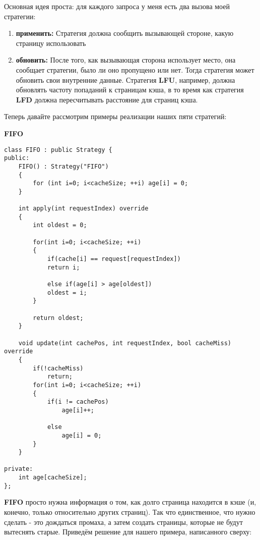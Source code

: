 Основная идея проста: для каждого запроса у меня есть два вызова моей стратегии:
\begin{enumerate}
    \item \textbf{применить:} Стратегия должна сообщить вызывающей стороне, какую страницу использовать
    \item \textbf{обновить:} После того, как вызывающая сторона использует место, она сообщает стратегии, было ли оно пропущено или нет. Тогда стратегия может обновить свои внутренние данные. Стратегия \textbf{LFU}, например, должна обновлять частоту попаданий к страницам кэша, в то время как стратегия \textbf{LFD} должна пересчитывать расстояние для страниц кэша.
\end{enumerate}

\vspace{\baselineskip}

Теперь давайте рассмотрим примеры реализации наших пяти стратегий:

\vspace{\baselineskip}
\textbf{FIFO}

\begin{tcolorbox}
\begin{verbatim}
class FIFO : public Strategy {
public:
	FIFO() : Strategy("FIFO")
	{
		for (int i=0; i<cacheSize; ++i) age[i] = 0;
	}
	
	int apply(int requestIndex) override
	{
		int oldest = 0;
		
		for(int i=0; i<cacheSize; ++i)
		{
			if(cache[i] == request[requestIndex])
			return i;
			
			else if(age[i] > age[oldest])
			oldest = i;
		}
		
		return oldest;
	}
	
	void update(int cachePos, int requestIndex, bool cacheMiss) override
	{
		if(!cacheMiss)
			return;
		for(int i=0; i<cacheSize; ++i)
		{
			if(i != cachePos)
				age[i]++;
			
			else
				age[i] = 0;
		}
	}

private:
	int age[cacheSize];
};
\end{verbatim}
\end{tcolorbox}

\textbf{FIFO} просто нужна информация о том, как долго страница находится в кэше (и, конечно, только относительно других страниц). Так что единственное, что нужно сделать - это дождаться промаха, а затем создать страницы, которые не будут вытеснять старые. Приведём решение для нашего примера, написанного сверху:

